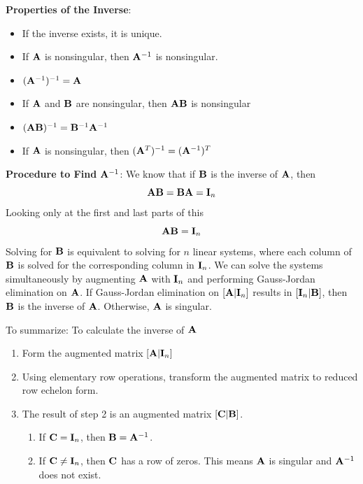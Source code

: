 \documentclass[]{book}
\theoremstyle{definition}
\theoremstyle{definition}
\theoremstyle{definition}
\theoremstyle{remark}
\begin{document}
\textbf{Properties of the Inverse}:

\begin{itemize}
\item
  If the inverse exists, it is unique.
\item
  If \({\bf A}\) is nonsingular, then \({\bf A}^{-1}\) is nonsingular.
\item
  \(({\bf A}^{-1})^{-1} = {\bf A}\)
\item
  If \({\bf A}\) and \({\bf B}\) are nonsingular, then
  \({\bf A}{\bf B}\) is nonsingular
\item
  \(({\bf A}{\bf B})^{-1} = {\bf B}^{-1}{\bf A}^{-1}\)
\item
  If \({\bf A}\) is nonsingular, then
  \(({\bf A}^T)^{-1}=({\bf A}^{-1})^T\)
\end{itemize}

\textbf{Procedure to Find} \({\bf A}^{-1}\): We know that if \({\bf B}\)
is the inverse of \({\bf A}\), then
\[{\bf A} {\bf B} = {\bf B} {\bf A} = {\bf I}_n\] Looking only at the
first and last parts of this \[{\bf A} {\bf B} = {\bf I}_n\] Solving for
\({\bf B}\) is equivalent to solving for \(n\) linear systems, where
each column of \({\bf B}\) is solved for the corresponding column in
\({\bf I}_n\). We can solve the systems simultaneously by augmenting
\({\bf A}\) with \({\bf I}_n\) and performing Gauss-Jordan elimination
on \({\bf A}\). If Gauss-Jordan elimination on \([{\bf A} | {\bf I}_n]\)
results in \([{\bf I}_n | {\bf B} ]\), then \({\bf B}\) is the inverse
of \({\bf A}\). Otherwise, \({\bf A}\) is singular.

To summarize: To calculate the inverse of \({\bf A}\)

\begin{enumerate}
\def\labelenumi{\arabic{enumi}.}
\item
  Form the augmented matrix \([ {\bf A} | {\bf I}_n]\)
\item
  Using elementary row operations, transform the augmented matrix to
  reduced row echelon form.
\item
  The result of step 2 is an augmented matrix \([ {\bf C} | {\bf B} ]\).

  \begin{enumerate}
  \def\labelenumii{\alph{enumii}.}
  \item
    If \({\bf C}={\bf I}_n\), then \({\bf B}={\bf A}^{-1}\).
  \item
    If \({\bf C}\ne{\bf I}_n\), then \(\bf C\) has a row of zeros. This
    means \({\bf A}\) is singular and \({\bf A}^{-1}\) does not exist.
  \end{enumerate}
\end{enumerate}
\end{document}
